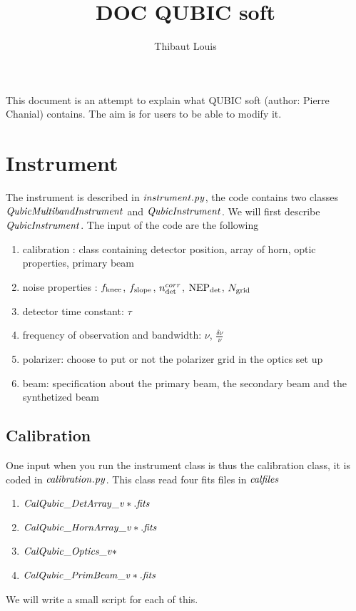 \documentclass[a4paper, 11pt]{article}
\date{}
\author{Thibaut Louis}
\begin{document}
\title{\textbf{DOC QUBIC soft}}
\maketitle


This document is an attempt to explain what QUBIC soft (author: Pierre Chanial) contains.
The aim is for users to be able to modify it. 


\section{Instrument}

The instrument is described in $\it{instrument.py}$, the code contains two classes $\it{QubicMultibandInstrument}$ and $\it{QubicInstrument}$. We will first describe $\it{QubicInstrument}$.
The input of the code are the following
\begin{enumerate}
\item calibration : class containing  detector position,  array of horn,  optic properties,  primary beam
\item noise properties :  $ f_{\rm knee}$, $f_{\rm slope}$, $n^{corr}_{\rm det}$, ${\rm NEP}_{\rm det}$, $N_{\rm grid}$ 
\item detector time constant: $\tau$
\item frequency of observation and bandwidth: $\nu$, $\frac{\delta \nu}{\nu}$
\item polarizer: choose to put or not the polarizer grid in the optics set up
\item beam: specification about the primary beam, the secondary beam and the synthetized beam
\end{enumerate}

\subsection{Calibration}

One input when you run the instrument class is thus the calibration class, it is coded in $\it{calibration.py}$. This class read four fits files in $\it{calfiles}$
\begin{enumerate}
\item $\it{CalQubic\_DetArray\_v*.fits}$
\item$ \it{CalQubic\_HornArray\_v*.fits}$
\item $\it{CalQubic\_Optics\_v*}$
\item $\it{CalQubic\_PrimBeam\_v*.fits}$
\end{enumerate}
We will write a small script for each of this.
\end{document}
